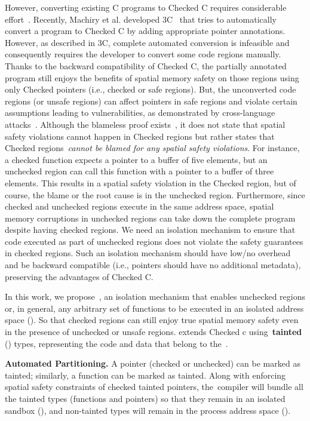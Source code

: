 However, converting existing C programs to Checked C requires considerable effort~\cite{duanrefactoring}. 
Recently, Machiry et al. developed 3C~\cite{machiry2022c} that tries to automatically convert a program to Checked C by adding appropriate pointer annotations.
However, as described in 3C, complete automated conversion is infeasible and consequently requires the developer to convert some code regions manually.
Thanks to the backward compatibility of Checked C, the partially annotated program still enjoys the benefits of spatial memory safety on those regions using only Checked pointers (i.e., checked or safe regions).
But, the unconverted code regions (or unsafe regions) can affect pointers in safe regions and violate certain assumptions leading to vulnerabilities, as demonstrated by cross-language attacks~\cite{mergendahlcross}.
%
Although the blameless proof exists~\cite{ruef2019achieving}, it does not state that spatial safety violations cannot happen in Checked regions but rather states that Checked regions~\emph{cannot be blamed for any spatial safety violations}.
For instance, a checked function expects a pointer to a buffer of five elements, but an unchecked region can call this function with a pointer to a buffer of three elements. This results in a spatial safety violation in the Checked region, but of course, the blame or the root cause is in the unchecked region.
Furthermore, since checked and unchecked regions execute in the same address space, spatial memory corruptions in unchecked regions can take down the complete program despite having checked regions.
We need an isolation mechanism to ensure that code executed as part of unchecked regions does not violate the safety guarantees in checked regions.
Such an isolation mechanism should have low/no overhead and be backward compatible (i.e., pointers should have no additional metadata), preserving the advantages of Checked C.

In this work, we propose~\systemname, an isolation mechanism that enables unchecked regions or, in general, any arbitrary set of functions to be executed in an isolated address space (\ucregion).
So that checked regions can still enjoy true spatial memory safety even in the presence of unchecked or unsafe regions.
\systemname extends Checked c using~\textbf{tainted} (\taintt) types, representing the code and data that belong to the~\ucregion.

\noindent
\textbf{Automated Partitioning.} A pointer (checked or unchecked) can be marked as tainted; similarly, a function can be marked as tainted.
Along with enforcing spatial safety constraints of checked tainted pointers, the~\systemname compiler will bundle all the tainted types (functions and pointers) so that they remain in an isolated sandbox (\ucregion), and non-tainted types will remain in the process address space (\cregion).

